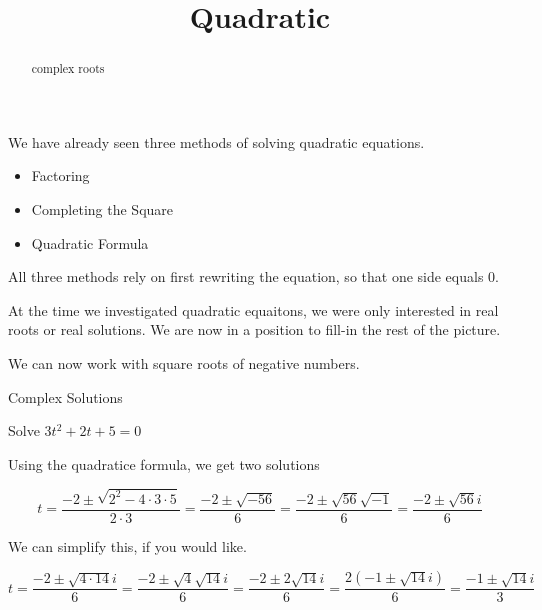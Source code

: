 \documentclass{ximera}
\title{Quadratic}
\begin{document}
\begin{abstract}
complex roots
\end{abstract}
\maketitle





We have already seen three methods of solving quadratic equations.

\begin{itemize}
	\item Factoring
	\item Completing the Square
	\item Quadratic Formula
	\end{itemize}


All three methods rely on first rewriting the equation, so that one side equals $0$.

At the time we investigated quadratic equaitons, we were only interested in real roots or real solutions.  We are now in a position to fill-in the rest of the picture.


We can now work with square roots of negative numbers.


\begin{example} Complex Solutions

Solve $3t^2 + 2t + 5 = 0$

Using the quadratice formula, we get two solutions

\[  t = \frac{-2 \pm \sqrt{2^2 - 4 \cdot 3 \cdot 5}}{2 \cdot 3}   =  \frac{-2 \pm \sqrt{-56}}{6}  =  \frac{-2 \pm \sqrt{56}\sqrt{-1}}{6}   =  \frac{-2 \pm \sqrt{56} i}{6}  \]



We can simplify this, if you would like.


\[  t = \frac{-2 \pm \sqrt{4 \cdot 14} i}{6}  = \frac{-2 \pm \sqrt{4} \sqrt{14} i}{6} = \frac{-2 \pm 2 \sqrt{14} i}{6} = \frac{2(-1 \pm \sqrt{14} i)}{6}   = \frac{-1 \pm \sqrt{14} i}{3}   \]



\end{example}
\end{document}
